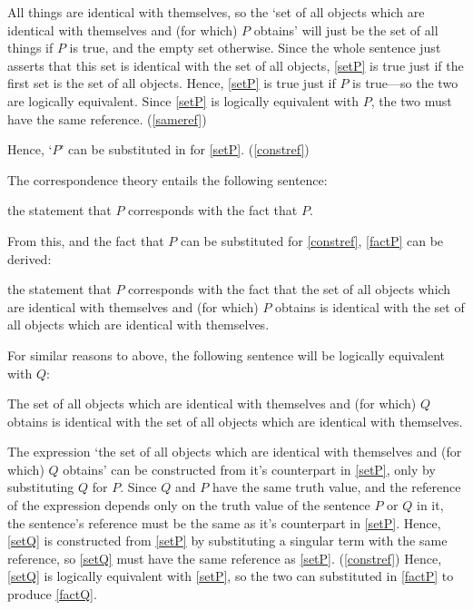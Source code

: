 All things are identical with themselves, so the `set of all objects which are identical with themselves and (for which) $P$ obtains' will just be the set of all things if $P$ is true, and the empty set otherwise.
Since the whole sentence just asserts that this set is identical with the set of all objects, \ref{setP} is true just if the first set is the set of all objects.
Hence, \ref{setP} is true just if $P$ is true---so the two are logically equivalent.
Since \ref{setP} is logically equivalent with $P$, the two must have the same reference.
(\ref{sameref})

Hence, `$P$' can be substituted in for \ref{setP}. (\ref{constref})

The correspondence theory entails the following sentence:

	\begin{example} \label{stateP}
	the statement that $P$ corresponds with the fact that $P$.
	\end{example}

From this, and the fact that $P$ can be substituted for \ref{constref}, \ref{factP} can be derived:

	\begin{example} \label{factP}
	the statement that $P$ corresponds with the fact that the set of all objects which are identical with themselves and (for which) $P$ obtains is identical with the set of all objects which are identical with themselves.
	\end{example}

For similar reasons to above, the following sentence will be logically equivalent with $Q$:

	\begin{example} \label{setQ}
	The set of all objects which are identical with themselves and (for which) $Q$ obtains is identical with the set of all objects which are identical with themselves.
	\end{example}

The expression `the set of all objects which are identical with themselves and (for which) $Q$ obtains' can be constructed from it's counterpart in \ref{setP}, only by substituting $Q$ for $P$.
Since $Q$ and $P$ have the same truth value, and the reference of the expression depends only on the truth value of the sentence $P$ or $Q$ in it, the sentence's reference must be the same as it's counterpart in \ref{setP}.
Hence, \ref{setQ} is constructed from \ref{setP} by substituting a singular term with the same reference, so \ref{setQ} must have the same reference as \ref{setP}.
(\ref{constref})
Hence, \ref{setQ} is logically equivalent with \ref{setP}, so the two can substituted in \ref{factP} to produce \ref{factQ}.


